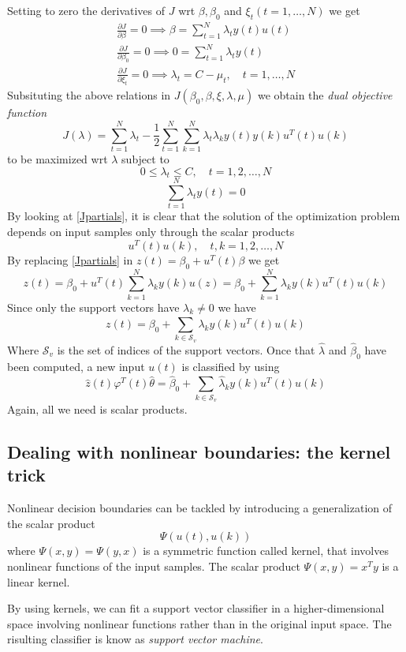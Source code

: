 \documentclass{book}
\begin{document}
Setting to zero the derivatives of $J$ wrt $\beta,\beta_0$ and $\xi_t(t=1,\dots,N)$ we get 
\begin{gather} \label{Jpartials}
  \displaystyle\frac{\partial J}{\partial \beta}= 0 \implies \beta=\displaystyle\sum_{t=1}^{N}\lambda_ty(t)u(t)\\
  \displaystyle\frac{\partial J}{\partial \beta_0}= 0 \implies 0=\displaystyle\sum_{t=1}^{N}\lambda_ty(t)\\
  \displaystyle\frac{\partial J}{\partial \xi_t}= 0 \implies \lambda_t=C-\mu_t, \quad t=1,\dots,N
\end{gather}
Subsituting the above relations in $J(\beta_0,\beta,\xi,\lambda,\mu)$ we obtain the \emph{dual objective function}
\[
  J(\lambda)=\displaystyle\sum_{t=1}^{N}\lambda_t-\displaystyle\frac{1}{2}\displaystyle\sum_{t=1}^{N}\displaystyle\sum_{k=1}^{N}\lambda_t\lambda_ky(t)y(k)u^T(t)u(k)
\]
to be maximized wrt $\lambda$ subject to 
\[
  0\leq \lambda_t \leq C, \quad t=1,2,\dots,N
\]
\[
  \displaystyle\sum_{t=1}^{N}\lambda_ty(t)=0
\]
By looking at \ref{Jpartials}, it is clear that the solution of the optimization problem depends on input samples only through the scalar products 
\[
  u^T(t)u(k), \quad t,k=1,2,\dots,N
\]
By replacing \ref{Jpartials} in $z(t)=\beta_0+u^T(t)\beta$ we get 
\[
  z(t) = \beta_0+u^T(t)\displaystyle\sum_{k=1}^{N}\lambda_ky(k)u(z)=\beta_0+\displaystyle\sum_{k=1}^{N}\lambda_ky(k)u^T(t)u(k)
\]
Since only the support vectors have $\lambda_k\neq 0$ we have 
\[
  z(t)=\beta_0+\displaystyle\sum_{k\in\mathcal{S}_v}^{}\lambda_ky(k)u^T(t)u(k)
\]
Where $\mathcal{S}_v$ is the set of indices of the support vectors. Once that $\hat{\lambda}$ and $\hat{\beta}_0$ have been computed, a new input $u(t)$ is classified by using 
\[
  \hat{z}(t)\varphi^T(t)\hat{\theta}=\hat{\beta}_0+\displaystyle\sum_{k\in\mathcal{S}_v}^{}\hat{\lambda}_ky(k)u^T(t)u(k)
\]
Again, all we need is scalar products. 
\subsection{Dealing with nonlinear boundaries: the kernel trick}
Nonlinear decision boundaries can be tackled by introducing a generalization of the scalar product 
\[
  \Psi(u(t),u(k))
\]
where $\Psi(x,y)=\Psi(y,x)$ is a symmetric function called kernel, that involves nonlinear functions of the input samples. The scalar product $\Psi(x,y)=x^Ty$ is a linear kernel. 

By using kernels, we can fit a support vector classifier in a higher-dimensional space involving nonlinear functions rather than in the original input space. The risulting classifier is know as \emph{support vector machine}.
\end{document}
